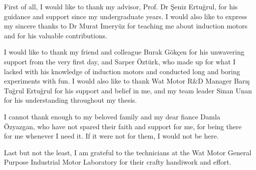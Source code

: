 \vspace*{-6pt}

First of all, I would like to thank my advisor, Prof. Dr Şeniz Ertuğrul, for his guidance and support since my undergraduate years. I would also like to express my sincere thanks to Dr Murat Imeryüz for teaching me about induction motors and for his valuable contributions.

I would like to thank my friend and colleague Burak Gökçen for his unwavering support from the very first day, and Sarper Öztürk, who made up for what I lacked with his knowledge of induction motors and conducted long and boring experiments with fun. I would also like to thank Wat Motor R\&D Manager Barış Tuğrul Ertuğrul for his support and belief in me, and my team leader Sinan Unan for his understanding throughout my thesis.

I cannot thank enough to my beloved family and my dear fiance Damla Özyazgan, who have not spared their faith and support for me, for being there for me whenever I need it. If it were not for them, I would not be here.

Last but not the least, I am grateful to the technicians at the Wat Motor General Purpose Industrial Motor Laboratory for their crafty handiwork and effort.